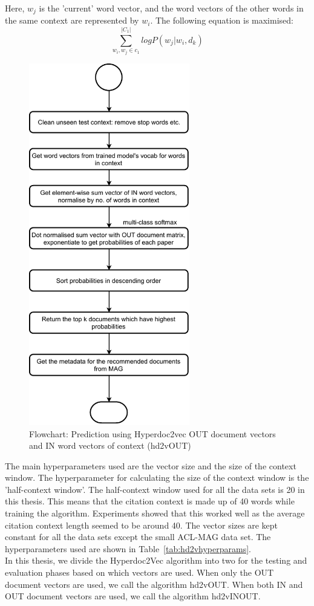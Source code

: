 Here, $w_j$ is the 'current' word vector, and the word vectors of the other words in the same context are represented by $w_i$.
The following equation is maximised: 
\begin{equation}
    \sum\limits_{w_i, w_j \in c_1}^{|C_1|} log P(w_j|{w_i, d_k})
\end{equation}
\begin{figure}
\centering
 \includegraphics[width=7cm]{figures/Approach/hd2vOUT.pdf}
  \caption{Flowchart: Prediction using Hyperdoc2vec OUT document vectors and IN word vectors of context (hd2vOUT)}
  \label{fig:hd2vOUT}
\end{figure}
The main hyperparameters used are the vector size and the size of the context window. The hyperparameter for calculating the size of the context window is the 'half-context window'. The half-context window used for all the data sets is 20 in this thesis. This means that the citation context is made up of 40 words while training the algorithm. Experiments showed that this worked well as the average citation context length seemed to be around 40. The vector sizes are kept constant for all the data sets except the small ACL-MAG data set. The hyperparameters used are shown in Table~\ref{tab:hd2vhyperparams}.\\
In this thesis, we divide the Hyperdoc2Vec algorithm into two for the testing and evaluation phases based on which vectors are used. When only the OUT document vectors are used, we call the algorithm hd2vOUT. When both IN and OUT document vectors are used, we call the algorithm hd2vINOUT.

